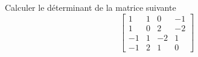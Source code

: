 Calculer le d\'eterminant de la matrice suivante
\[
\left[ 
\begin{array}{cccc}
1 & 1 & 0 & -1\\
1 & 0 & 2 & -2 \\
-1 & 1 & -2 & 1 \\
-1 & 2 & 1 & 0
\end{array}
\right]
\]